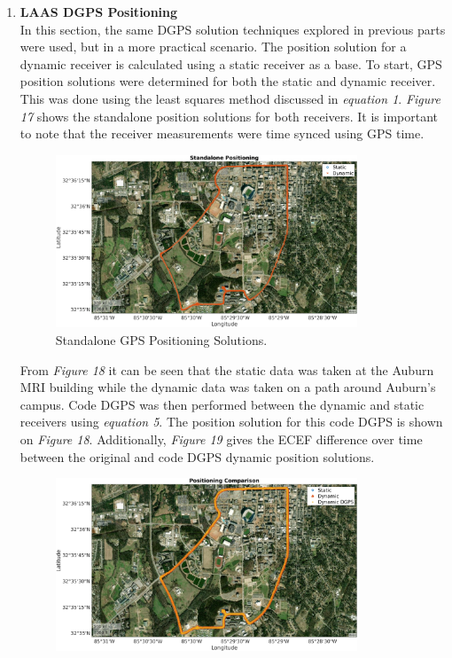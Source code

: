 \documentclass[11pt]{article}
\begin{document}
\begin{enumerate}[label=\textbf{\arabic*.}]
    \item \textbf{LAAS DGPS Positioning} \\
      In this section, the same DGPS solution techniques explored in previous parts were 
      used, but in a more practical scenario. The position solution for a dynamic receiver 
      is calculated using a static receiver as a base. To start, GPS position solutions were 
      determined for both the static and dynamic receiver. This was done using the least 
      squares method discussed in \emph{equation 1}. \emph{Figure 17} shows the standalone 
      position solutions for both receivers. It is important to note that the receiver 
      measurements were time synced using GPS time. 
      \begin{figure}[H]
        \centering
        \includegraphics[width=0.85\textwidth]{p4_a.png}
        \caption{Standalone GPS Positioning Solutions.}
      \end{figure}
      From \emph{Figure 18} it can be seen that the static data was taken at the Auburn MRI 
      building while the dynamic data was taken on a path around Auburn's campus. Code DGPS 
      was then performed between the dynamic and static receivers using \emph{equation 5}. 
      The position solution for this code DGPS is shown on \emph{Figure 18}. Additionally, 
      \emph{Figure 19} gives the ECEF difference over time between the original and code 
      DGPS dynamic position solutions. 
      \begin{figure}[H]
        \centering
        \includegraphics[width=0.85\textwidth]{p4_d.png}

\end{figure}
\end{enumerate}
\end{document}
